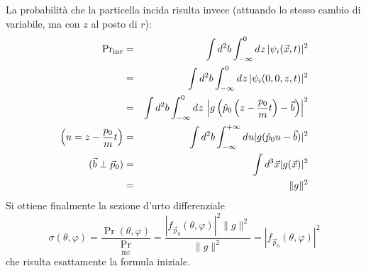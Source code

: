 \documentclass[../../FisicaTeorica.tex]{subfiles}
\begin{document}
La probabilit{\`a} che la particella incida risulta invece (attuando lo stesso
cambio di variabile, ma con $z$ al posto di $r$):
\begingroup
\allowdisplaybreaks
\begin{eqnarray*}
  \text{Pr}_{\text{inc}} & = & \int d^2 b \int_{- \infty}^0 d^{} z \hspace{0.17em} |
  \psi_i (\vec{x}, t) |^2\\
  & = & \int d^2 b \int_{- \infty}^0 d^{} z \hspace{0.17em} | \psi_i (0, 0,
  z, t) |^2\\
  & = & \int d^2 b \int_{- \infty}^0 d^{} z \hspace{0.17em} \left| g \left(
  \hat{p}_0  \left( z - \frac{p_0}{m} t \right) - \vec{b} \right) \right|^2\\
  \left( u = z - \frac{p_0}{m} t \right) & = & \int d^2 b \int_{- \infty}^{+
  \infty} d^{} u | g (\hat{p}_0 u - \vec{b}) |^2\\
  (\vec{b} \perp \vec{p}_0) & = & \int d^3 \vec{x}  | g (\vec{x}) |^2\\
  & = & \| g \|^2
\end{eqnarray*}
\endgroup
Si ottiene
finalmente la sezione d'urto differenziale
\begin{equation}
\label{sezdurtodifffinale}
\sigma (\theta, \varphi) = \frac{\Pr (\theta, \varphi)}{\Pr_{\text{inc}}} =
   \frac{| f_{\vec{p}_0} (\theta, \varphi) |^2 \| g \|^2}{\| g \|^2} = |
   f_{\vec{p}_0} (\theta, \varphi) |^2
\end{equation}
che risulta esattamente la formula iniziale.
\end{document}
